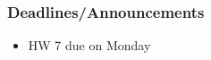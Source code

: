 
\begin{frame}
    \frametitle{Deadlines/Announcements}
    \begin{itemize}
        \item HW 7 due on Monday
    \end{itemize}
\end{frame}
